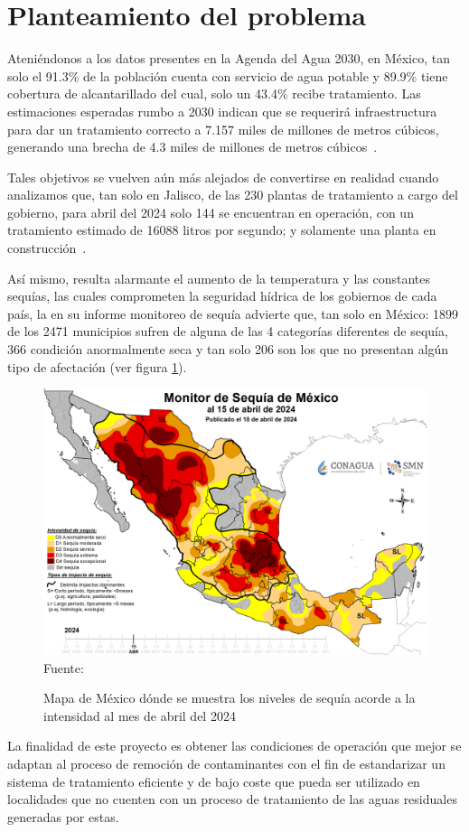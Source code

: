 \section{Planteamiento del problema}
Ateniéndonos a los datos presentes en la Agenda del Agua 2030, en México, tan solo el 91.3\% de la población cuenta con servicio de agua potable y 89.9\% tiene cobertura de alcantarillado del cual, solo un 43.4\% recibe tratamiento. Las estimaciones esperadas rumbo a 2030 indican que se requerirá infraestructura para dar un tratamiento correcto a 7.157 miles de millones de metros cúbicos, generando una brecha de 4.3 miles de millones de metros cúbicos~\citep{aa2030}.\par
Tales objetivos se vuelven aún más alejados de convertirse en realidad cuando analizamos que, tan solo en Jalisco, de las 230 plantas de tratamiento a cargo del gobierno, para abril del 2024 solo 144 se encuentran en operación, con un tratamiento estimado de 16088 litros por segundo; y solamente una planta en construcción~\citep{CEAJ24}.\par
Así mismo, resulta alarmante el aumento de la temperatura y las constantes sequías, las cuales comprometen la seguridad hídrica de los gobiernos de cada país, la \cite{CNA2024} en su informe monitoreo de sequía advierte que, tan solo en México: 1899 de los 2471 municipios sufren de alguna de las 4 categorías diferentes de sequía, 366 condición anormalmente seca y tan solo 206 son los que no presentan algún tipo de afectación (ver figura \ref{fig:sequia}).
\begin{figure}[H]
	\centering
	\includegraphics[scale=0.35]{../Images/Sequia.pdf}
	\\\small{Fuente: \cite{CNA2024}}
	\caption{Mapa de México dónde se muestra los niveles de sequía acorde a la intensidad al mes de abril del 2024}\label{fig:sequia}
\end{figure}
La finalidad de este proyecto es obtener las condiciones de operación que mejor se adaptan al proceso de remoción de contaminantes con el fin de estandarizar un sistema de tratamiento eficiente y de bajo coste que pueda ser utilizado en localidades que no cuenten con un proceso de tratamiento de las aguas residuales generadas por estas.